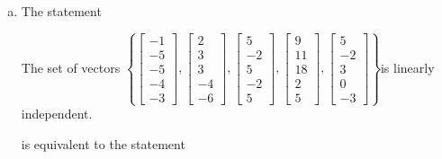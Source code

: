 \begin{exerciseAnswer}
\begin{enumerate}[(a)]
\item The statement 
\begin{center}\begin{minipage}{0.8\textwidth}
 The set of vectors \( \left\{ \left[\begin{array}{c}
-1 \\
-5 \\
-5 \\
-4 \\
-3
\end{array}\right] , \left[\begin{array}{c}
2 \\
3 \\
3 \\
-4 \\
-6
\end{array}\right] , \left[\begin{array}{c}
5 \\
-2 \\
5 \\
-2 \\
5
\end{array}\right] , \left[\begin{array}{c}
9 \\
11 \\
18 \\
2 \\
5
\end{array}\right] , \left[\begin{array}{c}
5 \\
-2 \\
3 \\
0 \\
-3
\end{array}\right] \right\} \)is linearly independent.
\end{minipage}\end{center}
     is equivalent to the statement 
\begin{center}\begin{minipage}{0.8\textwidth}
 The vector equation \( x_{1} \left[\begin{array}{c}
-1 \\
-5 \\
-5 \\
-4 \\
-3
\end{array}\right] + x_{2} \left[\begin{array}{c}
2 \\
3 \\

\end{array}
\end{minipage}
\end{center}
\end{enumerate}
\end{exerciseAnswer}
